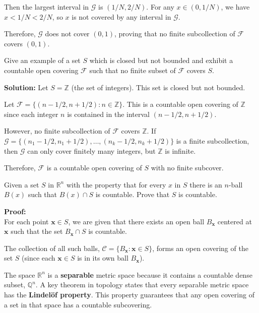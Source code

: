Then the largest interval in $\mathcal{G}$ is $(1/N, 2/N)$. For any $x \in (0, 1/N)$, we have $x < 1/N < 2/N$, so $x$ is not covered by any interval in $\mathcal{G}$.

Therefore, $\mathcal{G}$ does not cover $(0,1)$, proving that no finite subcollection of $\mathcal{F}$ covers $(0,1)$.

\begin{problembox}
Give an example of a set \( S \) which is closed but not bounded and exhibit a countable open covering \( \mathcal{F} \) such that no finite subset of \( \mathcal{F} \) covers \( S \).
\end{problembox}

\textbf{Solution:} Let $S = \mathbb{Z}$ (the set of integers). This set is closed but not bounded.

Let $\mathcal{F} = \{(n-1/2, n+1/2) : n \in \mathbb{Z}\}$. This is a countable open covering of $\mathbb{Z}$ since each integer $n$ is contained in the interval $(n-1/2, n+1/2)$.

However, no finite subcollection of $\mathcal{F}$ covers $\mathbb{Z}$. If $\mathcal{G} = \{(n_1-1/2, n_1+1/2), \ldots, (n_k-1/2, n_k+1/2)\}$ is a finite subcollection, then $\mathcal{G}$ can only cover finitely many integers, but $\mathbb{Z}$ is infinite.

Therefore, $\mathcal{F}$ is a countable open covering of $S$ with no finite subcover.

\begin{problembox}
Given a set \( S \) in \( \mathbb{R}^n \) with the property that for every \( x \) in \( S \) there is an \( n \)-ball \( B(x) \) such that \( B(x) \cap S \) is countable. Prove that \( S \) is countable.
\end{problembox}

\textbf{Proof:}\\
For each point $\mathbf{x} \in S$, we are given that there exists an open ball $B_\mathbf{x}$ centered at $\mathbf{x}$ such that the set $B_\mathbf{x} \cap S$ is countable.

The collection of all such balls, $\mathcal{C} = \{B_\mathbf{x} : \mathbf{x} \in S\}$, forms an open covering of the set $S$ (since each $\mathbf{x} \in S$ is in its own ball $B_\mathbf{x}$).

The space $\mathbb{R}^n$ is a \textbf{separable} metric space because it contains a countable dense subset, $\mathbb{Q}^n$. A key theorem in topology states that every separable metric space has the \textbf{Lindelöf property}. This property guarantees that any open covering of a set in that space has a countable subcovering.

